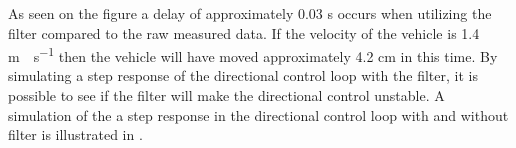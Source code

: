 As seen on the figure a delay of approximately 0.03 s occurs when utilizing the filter compared to the raw measured data. If the velocity of the vehicle is 1.4 \si{m \cdot s^{-1}} then the vehicle will have moved approximately 4.2 \si{cm} in this time. By simulating a step response of the directional control loop with the filter, it is possible to see if the filter will make the directional control unstable. A simulation of the a step response in the directional control loop with and without filter is illustrated in .
